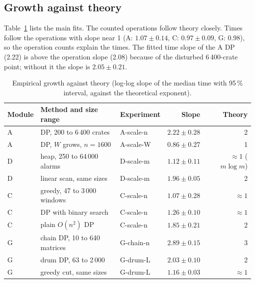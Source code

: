 \documentclass[11pt,a4paper]{article}
\begin{document}
\subsection{Growth against theory}
Table~\ref{tab:fits} lists the main fits. The counted operations follow theory closely. Times follow the operations with slope near 1 (A: $1.07\pm0.14$, C: $0.97\pm0.09$, G: $0.98$), so the operation counts explain the times.
The fitted time slope of the A DP (2.22) is above the operation slope (2.08) because of the disturbed 6\,400-crate point; without it the slope is $2.05\pm0.21$.

\begin{table}[t]
\centering\small
\caption{Empirical growth against theory (log-log slope of the median time with 95\,\% interval, against the theoretical exponent).}\label{tab:fits}
\begin{tabularx}{\textwidth}{@{}llXrr@{}}
\toprule
Module & Method and size range & Experiment & Slope & Theory\\
\midrule
A & DP, 200 to 6\,400 crates & A-scale-n & $2.22\pm0.28$ & 2\\
A & DP, $W$ grows, $n=1600$ & A-scale-W & $0.86\pm0.27$ & 1\\
D & heap, 250 to 64\,000 alarms & D-scale-m & $1.12\pm0.11$ & $\approx1$ ($m\log m$)\\
D & linear scan, same sizes & D-scale-m & $1.96\pm0.05$ & 2\\
C & greedy, 47 to 3\,000 windows & C-scale-n & $1.07\pm0.28$ & $\approx1$\\
C & DP with binary search & C-scale-n & $1.26\pm0.10$ & $\approx1$\\
C & plain $O(n^2)$ DP & C-scale-n & $1.85\pm0.21$ & 2\\
G & chain DP, 10 to 640 matrices & G-chain-n & $2.89\pm0.15$ & 3\\
G & drum DP, 63 to 2\,000 & G-drum-L & $2.03\pm0.10$ & 2\\
G & greedy cut, same sizes & G-drum-L & $1.16\pm0.03$ & $\approx1$\\
\bottomrule
\end{tabularx}
\end{table}
\end{document}
